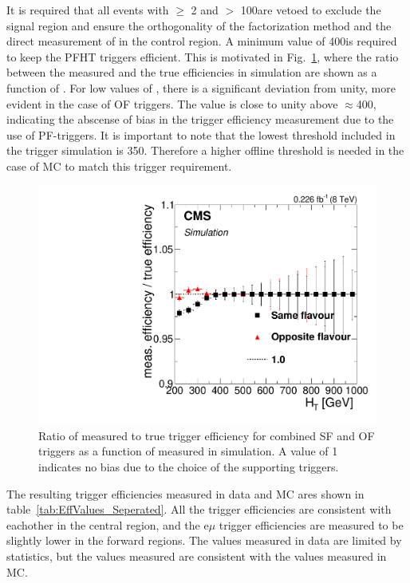 It is required that all events with \nj $\geq$ 2 and \MET $>$ 100\GeV are vetoed to exclude the signal region
and ensure the orthogonality of the factorization method and the direct measurement of \rsfof in the control region.
A minimum \HT value of 400\GeV is required to keep the PFHT triggers efficient.
This is motivated in Fig.~\ref{fig:triggerBias},
where the ratio between the measured and the true efficiencies in \ttbar simulation are shown as a function of \HT.
For low values of \HT, there is a significant deviation from unity,
more evident in the case of OF triggers.
The value is close to unity above $\approx$400\GeV,
indicating the abscense of bias in the trigger efficiency measurement due to the use of PF-\HT triggers.
It is important to note that the lowest \HT threshold included in the trigger simulation is 350\GeV.
Therefore a higher offline \HT threshold is needed in the case of MC to match this trigger requirement. 

\begin{figure}[h]
  \begin{center}
    \includegraphics[scale=0.35]{bkgd/figs/Triggereff_AlphaTSyst_PFHT_HighHTExclusive_Run2015_25ns_HT_None.pdf}
    \caption{
      Ratio of measured to true trigger efficiency for combined SF and OF triggers as a function of \HT measured in \ttbar simulation.
      A value of 1 indicates no bias due to the choice of the supporting triggers.
    }
    \label{fig:triggerBias}
  \end{center}
\end{figure}

The resulting trigger efficiencies measured in data and MC ares shown in table~\ref{tab:EffValues_Seperated}.
All the trigger efficiencies are consistent with eachother in the central region,
and the e$\mu$ trigger efficiencies are measured to be slightly lower in the forward regions.
The values measured in data are limited by statistics, but the values measured are consistent with the values measured in MC.

